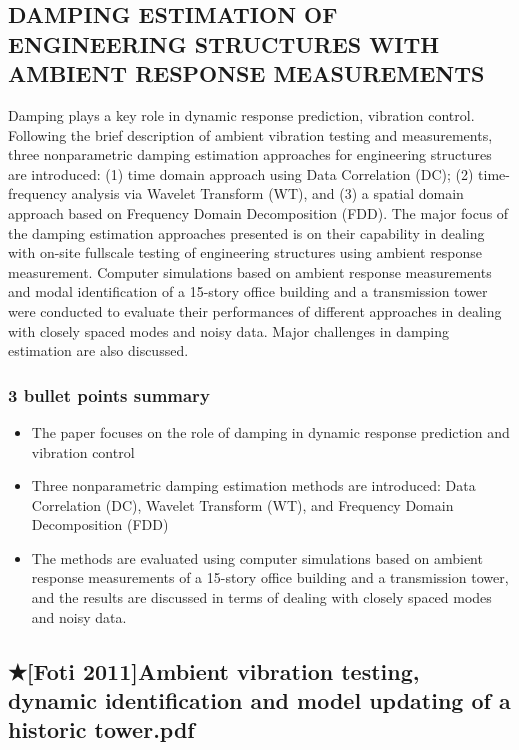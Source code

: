 \documentclass[
  letterpaper,
  DIV=11,
  numbers=noendperiod]{scrreprt}
\providecommand{\tightlist}{%
  \setlength{\itemsep}{0pt}\setlength{\parskip}{0pt}}\usepackage{longtable,booktabs,array}
\begin{document}
\hypertarget{damping-estimation-of-engineering-structures-with-ambient-response-measurements}{%
\subsection{DAMPING ESTIMATION OF ENGINEERING STRUCTURES WITH AMBIENT
RESPONSE
MEASUREMENTS}\label{damping-estimation-of-engineering-structures-with-ambient-response-measurements}}

Damping plays a key role in dynamic response prediction, vibration
control. Following the brief description of ambient vibration testing
and measurements, three nonparametric damping estimation approaches for
engineering structures are introduced: (1) time domain approach using
Data Correlation (DC); (2) time-frequency analysis via Wavelet Transform
(WT), and (3) a spatial domain approach based on Frequency Domain
Decomposition (FDD). The major focus of the damping estimation
approaches presented is on their capability in dealing with on-site
fullscale testing of engineering structures using ambient response
measurement. Computer simulations based on ambient response measurements
and modal identification of a 15-story office building and a
transmission tower were conducted to evaluate their performances of
different approaches in dealing with closely spaced modes and noisy
data. Major challenges in damping estimation are also discussed.

\hypertarget{bullet-points-summary-18}{%
\subsubsection{3 bullet points summary}\label{bullet-points-summary-18}}

\begin{itemize}
\tightlist
\item
  The paper focuses on the role of damping in dynamic response
  prediction and vibration control
\item
  Three nonparametric damping estimation methods are introduced: Data
  Correlation (DC), Wavelet Transform (WT), and Frequency Domain
  Decomposition (FDD)
\item
  The methods are evaluated using computer simulations based on ambient
  response measurements of a 15-story office building and a transmission
  tower, and the results are discussed in terms of dealing with closely
  spaced modes and noisy data.
\end{itemize}

\hypertarget{foti-2011ambient-vibration-testing-dynamic-identification-and-model-updating-of-a-historic-tower.pdf}{%
\subsection{★{[}Foti 2011{]}Ambient vibration testing, dynamic
identification and model updating of a historic
tower.pdf}\label{foti-2011ambient-vibration-testing-dynamic-identification-and-model-updating-of-a-historic-tower.pdf}}
\end{document}
